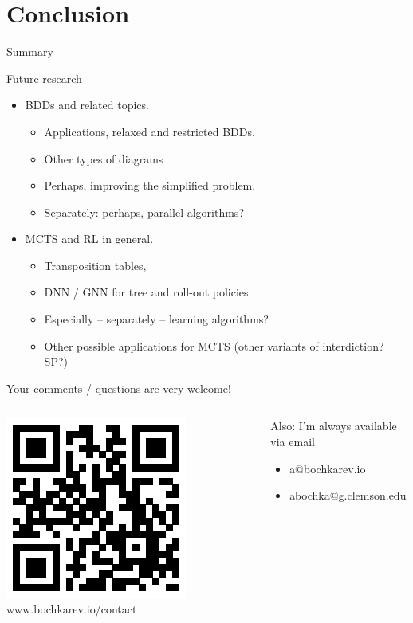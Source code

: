 \documentclass[10pt, xcolor=svgnames]{beamer}
\begin{document}
\section*{Conclusion}
\label{sec:org56c060a}
\begin{frame}[label={sec:org4516146}]{Summary}
\tableofcontents
\end{frame}
\begin{frame}[label={sec:org071c023}]{Future research}
\begin{itemize}
\item BDDs and related topics.
\begin{itemize}
\item Applications, \alert{relaxed} and \alert{restricted} BDDs.
\item Other types of diagrams
\item Perhaps, improving the simplified problem.
\item Separately: perhaps, parallel algorithms?
\end{itemize}
\item MCTS and RL in general.
\begin{itemize}
\item Transposition tables,
\item DNN / GNN for tree and roll-out policies.
\item Especially -- separately -- learning algorithms?
\item Other possible applications for MCTS (other variants of interdiction? SP?)
\end{itemize}
\end{itemize}
\end{frame}
\begin{frame}[label={sec:org13b2b43}]{Your comments / questions are very welcome!}
\begin{columns}
\begin{column}{0.5\columnwidth}
\centering
\includegraphics{./img/website.eps}
www.bochkarev.io/contact
\end{column}
\begin{column}{0.5\columnwidth}
Also: I'm always available via email
\begin{itemize}
\item a@bochkarev.io
\item abochka@g.clemson.edu
\end{itemize}
\end{column}
\end{columns}
\end{frame}
\end{document}
